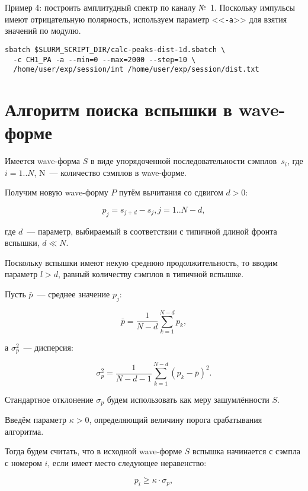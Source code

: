 \documentclass[12pt, a4paper, oneside, onecolumn]{book}
\newcommand{\CMDARG}[1]{<<{\tt #1}>>}
\begin{document}
\bigskip
Пример 4: построить амплитудный спектр по каналу №~1. Поскольку импульсы имеют отрицательную полярность, используем параметр \CMDARG{-a} для взятия значений по модулю.

\begin{lstlisting}
sbatch $SLURM_SCRIPT_DIR/calc-peaks-dist-1d.sbatch \
  -c CH1_PA -a --min=0 --max=2000 --step=10 \
  /home/user/exp/session/int /home/user/exp/session/dist.txt
\end{lstlisting}


\appendix

\chapter{Алгоритм поиска вспышки в wave-форме}

Имеется wave-форма $S$ в виде упорядоченной последовательности сэмплов~$s_i$, где $i = 1..N$, N~--- количество сэмплов в wave-форме.

Получим новую wave-форму $P$ путём вычитания со сдвигом $d > 0$:

$$
p_j = s_{j+d} - s_j, j = 1..N-d,
$$

\noindent где $d$~--- параметр, выбираемый в соответствии с типичной длиной фронта вспышки, $d \ll N$.

Поскольку вспышки имеют некую среднюю продолжительность, то вводим параметр $l > d$, равный количеству сэмплов в типичной вспышке. 

Пусть $\bar{p}$~--- среднее значение $p_j$:

$$
\bar{p} = \frac{1}{N-d} \sum_{k=1}^{N-d} p_k,
$$

\noindent а $\sigma_p^2$~--- дисперсия:

$$
\sigma_p^2 = \frac{1}{N-d-1} \sum_{k=1}^{N-d} \left( p_k - \bar{p} \right) ^2.
$$

Стандартное отклонение $\sigma_p$ будем использовать как меру зашумлённости $S$.

Введём параметр $\kappa > 0$, определяющий величину порога срабатывания алгоритма.

Тогда будем считать, что в исходной wave-форме $S$ вспышка начинается с сэмпла с номером $i$, если имеет место следующее неравенство:

\begin{equation}
p_i \ge \kappa \cdot \sigma_p,
\end{equation}
\end{document}
